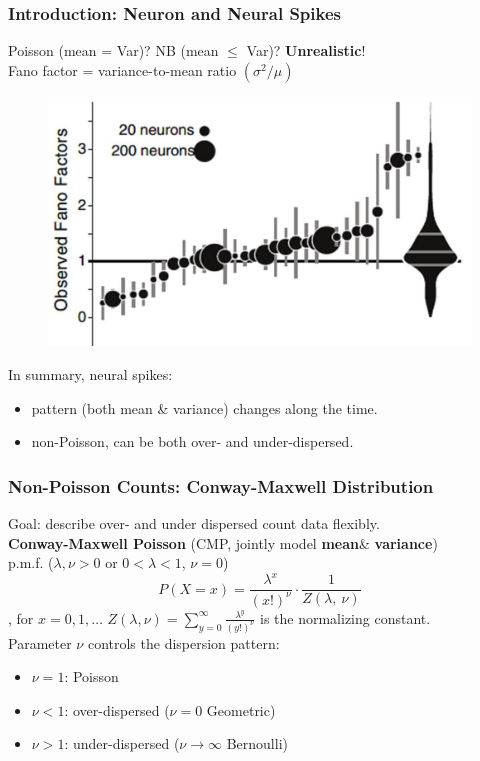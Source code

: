 \documentclass{beamer}
\begin{document}
	\begin{frame}
		\frametitle{Introduction: Neuron and Neural Spikes}
		Poisson (mean = Var)? NB (mean $\leq$ Var)? \textbf{Unrealistic}!\\
		Fano factor = variance-to-mean ratio $(\sigma^2/ \mu)$
		\begin{figure}
			\includegraphics[width=0.5\linewidth]{ff.jpg}
		\end{figure}
		In summary, neural spikes:
		\begin{itemize}
			\item
			pattern (both mean \& variance) changes along the time.
			\item
			non-Poisson, can be both over- and under-dispersed.
		\end{itemize}
	\end{frame}
	
	\begin{frame}
		\frametitle{Non-Poisson Counts: Conway-Maxwell Distribution}
		Goal: describe over- and under dispersed count data flexibly.\\
		\textbf{Conway-Maxwell Poisson} (CMP, jointly model \textbf{mean}\& \textbf{variance})\\
		p.m.f. (\(\lambda,\nu > 0\) or
		\(0 < \lambda < 1\), \(\nu = 0\))
		\[P(X = x) = \frac{\lambda^{x}}{(x!)^{\nu}} \cdot \frac{1}{Z(\lambda,\ \nu)}\]
		, for $x = 0, 1,\ldots$ \(Z(\lambda,\nu) = \sum_{y = 0}^{\infty}\frac{\lambda^{y}}{(y!)^{\nu}}\) is the normalizing constant.\\
		Parameter $\nu$ controls the dispersion pattern:
		\begin{itemize}
			\item
			\(\nu = 1\): Poisson
			\item
			\(\nu < 1\): over-dispersed (\(\nu = 0\) Geometric)
			\item
			\(\nu > 1\): under-dispersed (\(\nu \rightarrow \infty\) Bernoulli)
		\end{itemize}
	\end{frame}
	
\end{document}
